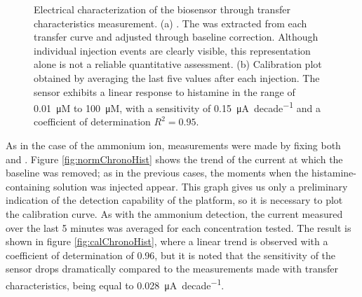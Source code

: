 \begin{figure}[htbp]
    \centering
    \quad
    \caption{Electrical characterization of the biosensor through transfer characteristics measurement.
        (a) \ioncorr{}. The \ion{} was extracted from each transfer curve and adjusted through baseline correction. Although individual injection events are clearly visible, this representation alone is not a reliable quantitative assessment. 
        (b) Calibration plot obtained by averaging the last five \ioncorr{} values after each injection. The sensor exhibits a linear response to histamine in the range of \SI{0.01}{\micro M} to \SI{100}{\micro M}, with a sensitivity of \SI{0.15}{\uA \per decade} and a coefficient of determination $R^2 = 0.95$.}
    \label{fig:HisTransfers}
\end{figure}

As in the case of the ammonium ion, measurements were made by fixing both \vds{} and \vgs{}. Figure \ref{fig:normChronoHist} shows the trend of the current at which the baseline was removed; as in the previous cases, the moments when the histamine-containing solution was injected appear. This graph gives us only a preliminary indication of the detection capability of the platform, so it is necessary to plot the calibration curve. As with the ammonium detection, the current measured over the last 5 minutes was averaged for each concentration tested. The result is shown in figure \ref{fig:calChronoHist}, where a linear trend is observed with a coefficient of determination of 0.96, but it is noted that the sensitivity of the sensor drops dramatically compared to the measurements made with transfer characteristics, being equal to \SI{0.028}{\uA \per decade}.

